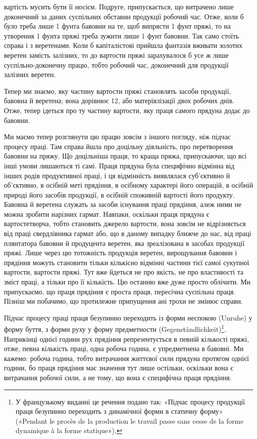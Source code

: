 \parcont{}  %
вартість мусить бути її носієм. Подруге, припускається, що витрачено
лише доконечний за даних суспільних обставин продукції
робочий час. Отже, коли б було треба лише 1 фунта бавовни
на те, щоб випрясти 1 фунт пряжі, то на утворення 1 фунта пряжі
треба зужити лише 1 фунт бавовни. Так само стоїть справа і з
веретенами. Коли б капіталістові прийшла фантазія вживати
золотих веретен замість залізних, то до вартости пряжі зарахувалося
б усе ж лише суспільно-доконечну працю, тобто робочий
час, доконечний для продукції залізних веретен.

Тепер ми знаємо, яку частину вартости пряжі становлять
засоби продукції, бавовна й веретена; вона дорівнює 12,
або матеріялізації двох робочих днів. Отже, тепер ідеться про
ту частину вартости, яку праця самого прядуна додає до бавовни.

Ми маємо тепер розглянути цю працю зовсім з іншого погляду,
ніж підчас процесу праці. Там справа йшла про доцільну діяльність,
про перетворення бавовни на пряжу. Що доцільніша праця,
то краща пряжа, припускаючи, що всі інші умови лишаються
ті самі. Праця прядуна була специфічно відмінна від інших
родів продуктивної праці, і ця відмінність виявлялася суб’єктивно
й об’єктивно, в осібній меті прядіння, в осібному характері його
операцій, в осібній природі його засобів продукції, в осібній споживній
вартості його продукту. Бавовна й веретена служать
за засоби існування праці прядіння, алеж ними не можна зробити
нарізних гармат. Навпаки, оскільки праця прядуна є вартостетворча,
тобто становить джерело вартости, вона зовсім не відрізняється
від праці свердлівника гармат або, що в даному випадку
ближче до нас, від праці плянтатора бавовни й продуцента
веретен, яка зреалізована в засобах продукції пряжі. Лише через
цю тотожність продукція веретен, вирощування бавовни і прядіння
можуть становити тільки кількісно відмінні частини тієї
самої сукупної вартости, вартости пряжі. Тут вже йдеться не
про якість, не про властивості та зміст праці, а тільки про її
кількість. Цю останню вже дуже просто облічити. Ми припускаємо,
що праця прядіння є проста праця, пересічна суспільна
праця. Пізніш ми побачимо, що протилежне припущення ані
трохи не змінює справи.

\disablefootnotebreak{}
Підчас процесу праці праця безупинно переходить із форми
неспокою (Unruhe) у форму буття, з форми руху у форму предметности
(\textgerman{Gegenständlichkeit})\footnote*{
У французькому виданні це речення подано так: «Підчас
процесу продукції праця безупинно переходить з динамічної форми в статичну
форму» («Pendant le procès de la production le travail passe sans
cesse de la forme dynamique à la forme statique»). \Red{}
}. Наприкінці однієї години рух
прядіння репрезентується в певній кількості пряжі, отже, певна
кількість праці, одна робоча година, є упредметнена в бавовні.
Ми кажемо: робоча година, тобто витрачання життєвої сили прядуна
протягом однієї години, бо праця прядіння має значення
тут лише остільки, оскільки вона є витрачання робочої сили,
а не тому, що вона є специфічна праця прядіння.
\enablefootnotebreak{}
